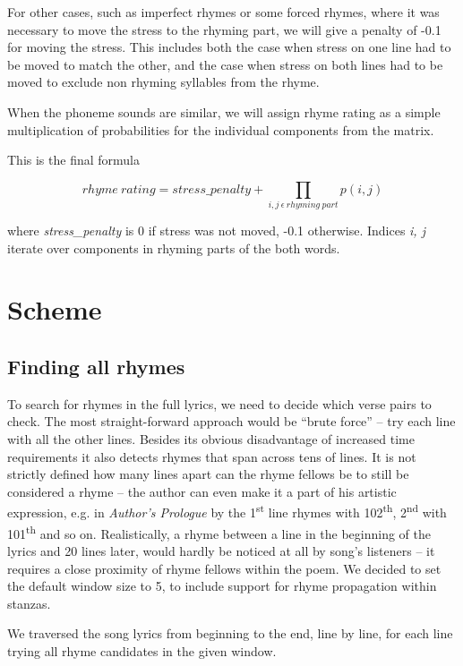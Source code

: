  For other cases, such as imperfect rhymes or some forced rhymes, where it was necessary to move the stress to the rhyming part, we will give a penalty of -0.1 for moving the stress. This includes both the case when stress on one line had to be moved to match the other, and the case when stress on both lines had to be moved to exclude non rhyming syllables from the rhyme.
  
	When the phoneme sounds are similar, we will assign rhyme rating as a simple multiplication of probabilities for the individual components from the matrix. 

This is the final formula
	
	\[rhyme\ rating = stress\_penalty + \prod_{i,j\ \epsilon\ rhyming\ part} p(i,j) \]
	
where \textit{stress\_penalty} is 0 if stress was not moved, -0.1 otherwise. Indices \textit{i, j} iterate over components in rhyming parts of the both words.





\section{Scheme}
\subsection{Finding all rhymes}\label{finding-all-rhymes}
To search for rhymes in the full lyrics, we need to decide which verse pairs to check. The most straight-forward approach would be ``brute force'' -- try each line with all the other lines. Besides its obvious disadvantage of increased time requirements it also detects rhymes that span across tens of lines. It is not strictly defined how many lines apart can the rhyme fellows be to still be considered a rhyme -- the author can even make it a part of his artistic expression, e.g. in \textit{Author's Prologue} by \cite{thomas1952author} the 1\textsuperscript{st} line rhymes with 102\textsuperscript{th}, 2\textsuperscript{nd} with 101\textsuperscript{th} and so on. Realistically, a rhyme between a line in the beginning of the lyrics and 20 lines later, would hardly be noticed at all by song's listeners -- it requires a close proximity of rhyme fellows within the poem. We decided to set the default window size to 5, to include support for rhyme propagation within stanzas.


We traversed the song lyrics from beginning to the end, line by line, for each line trying all rhyme candidates in the given window.

